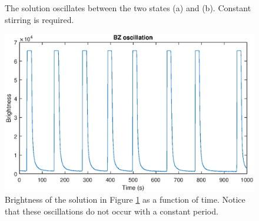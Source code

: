 \documentclass[twocolumn,amsmath,amssymb,aps]{revtex4}
\begin{document}
\begin{figure}[!htb]
	\centering
	\caption{The solution oscillates between the two states (a) and (b). Constant stirring is required.}
	\label{fig:Osc}
\end{figure}
\begin{figure}[!htb]
	\centering
	\includegraphics[scale=0.45]{osc-lab}
	\caption{Brightness of the solution in Figure \ref{fig:Osc} as a function of time. Notice that these oscillations do not occur with a constant period.}
	\label{fig:osc-time}
\end{figure}
\end{document}
